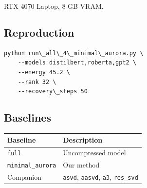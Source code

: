 RTX 4070 Laptop, 8 GB VRAM.

\subsection{Reproduction}

\begin{lstlisting}
python run\_all\_4\_minimal\_aurora.py \
    --models distilbert,roberta,gpt2 \
    --energy 45.2 \
    --rank 32 \
    --recovery\_steps 50
\end{lstlisting}

\subsection{Baselines}

\begin{table}[H]
\centering
\small
\begin{tabular}{ll}
\toprule
\textbf{Baseline} & \textbf{Description} \\
\midrule
\texttt{full} & Uncompressed model \\
\texttt{minimal\_aurora} & Our method \\
Companion & \texttt{asvd}, \texttt{aasvd}, \texttt{a3}, \texttt{res\_svd} \\
\bottomrule
\end{tabular}
\end{table}

